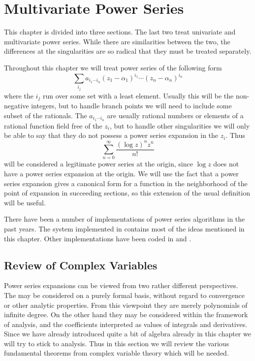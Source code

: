 \chapter{Multivariate Power Series}
\label{MSeries:Chap}

This chapter is divided into three sections.  The last two treat
univariate and multivariate power series.  While there are
similarities between the two, the differences at the singularities are
so radical that they must be treated separately.

Throughout this chapter we will treat power series of the following form
\[
\sum_{i_j} a_{i_1 \cdots i_n} 
(z_1 - \alpha_1)^{i_1} \cdots (z_n - \alpha_n)^{i_n}
\]
where the $i_j$ run over some set with a least element.  Usually this 
will be the non-negative integers, but to handle branch points we will need
to include some subset of the rationals.  The $a_{i_1 \cdots i_n}$
are usually rational numbers or elements of a rational function field
free of the $z_i$, but to handle other singularities we will only be able to
say that they do not possess a power series expansion in the $z_i$.
Thus 
\[
\sum_{n = 0}^{\infty} \frac{(\log z)^n z^n}{n!}
\]
will be considered a legitimate power series at the origin, since
$\log z$ does not have a power series expansion at the origin.  We
will use the fact that a power series expansion gives a canonical form
for a function in the neighborhood of the point of expansion in
succeeding sections, so this extension of the usual definition will be
useful.

There have been a number of implementations of power series algorithms
in the past years.  The system implemented in {\Macsyma} contains most
of the ideas mentioned in this chapter.  Other implementations have
been coded in {\Axiom} and {\Altran}.

\section{Review of Complex Variables}

Power series expansions can be viewed from two rather different
perspectives.  The may be considered on a purely formal basis, without 
regard to convergence or other analytic properties.  From this viewpoint
they are merely polynomials of infinite degree.  On the other hand they 
may be considered within the framework of analysis, and the coefficients
interpreted as values of integrals and derivatives.  Since we have
already introduced quite a bit of algebra already in this chapter we will
try to stick to analysis.  Thus in this section we will review the various
fundamental theorems from complex variable theory which will be needed.

